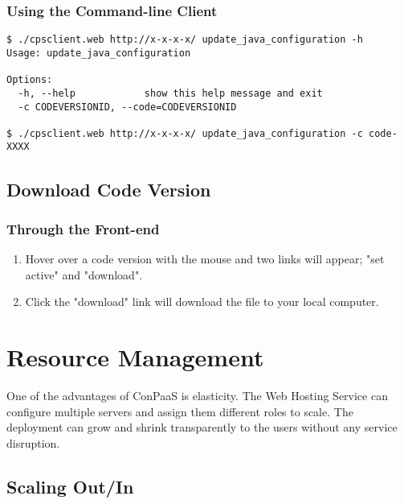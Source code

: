 \documentclass[12pt]{article}
\newenvironment{framedbox}[1]%
{\begin{framed}
 \begingroup
 \fontsize{#1}{#1}\selectfont
}
{
 \endgroup
 \end{framed}
}
\begin{document}
\subsubsection{Using the Command-line Client}
\begin{framedbox}{8pt}\begin{verbatim}
$ ./cpsclient.web http://x-x-x-x/ update_java_configuration -h
Usage: update_java_configuration

Options:
  -h, --help            show this help message and exit
  -c CODEVERSIONID, --code=CODEVERSIONID

$ ./cpsclient.web http://x-x-x-x/ update_java_configuration -c code-XXXX
\end{verbatim}\end{framedbox}

\subsection{Download Code Version}
\subsubsection{Through the Front-end}
\begin{enumerate}
\item Hover over a code version with the mouse and two links will appear;
      "set active" and "download".
\item Click the "download" link will download the file to your local computer.
\end{enumerate}

\section{Resource Management}
One of the advantages of ConPaaS is elasticity. The Web Hosting Service can
configure multiple servers and assign them different roles to scale. The
deployment can grow and shrink transparently to the users without any
service disruption.

\subsection{Scaling Out/In}
\end{document}
